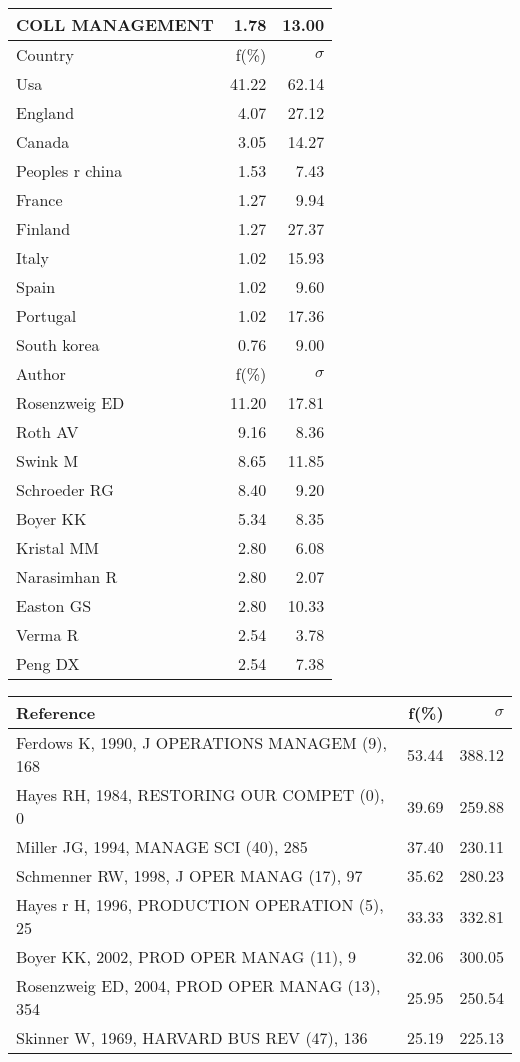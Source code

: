 \documentclass[a4paper,11pt]{report}
\begin{document}
\begin{landscape}
\begin{table}[!ht]
{\begin{tabular}{|l r r|}
COLL MANAGEMENT & 1.78 & 13.00\\
\hline
\hline
Country & f(\%) & $\sigma$\\
\hline
Usa & 41.22 & 62.14\\
England & 4.07 & 27.12\\
Canada & 3.05 & 14.27\\
Peoples r china & 1.53 & 7.43\\
France & 1.27 & 9.94\\
Finland & 1.27 & 27.37\\
Italy & 1.02 & 15.93\\
Spain & 1.02 & 9.60\\
Portugal & 1.02 & 17.36\\
South korea & 0.76 & 9.00\\
\hline
\hline
Author & f(\%) & $\sigma$\\
\hline
Rosenzweig ED & 11.20 & 17.81\\
Roth AV & 9.16 & 8.36\\
Swink M & 8.65 & 11.85\\
Schroeder RG & 8.40 & 9.20\\
Boyer KK & 5.34 & 8.35\\
Kristal MM & 2.80 & 6.08\\
Narasimhan R & 2.80 & 2.07\\
Easton GS & 2.80 & 10.33\\
Verma R & 2.54 & 3.78\\
Peng DX & 2.54 & 7.38\\
\hline
\end{tabular}
}
{\scriptsize\begin{tabular}{|l r r|}
\hline
Reference & f(\%) & $\sigma$\\
\hline
Ferdows K, 1990, J OPERATIONS MANAGEM (9), 168 & 53.44 & 388.12\\
Hayes RH, 1984, RESTORING OUR COMPET (0), 0 & 39.69 & 259.88\\
Miller JG, 1994, MANAGE SCI (40), 285 & 37.40 & 230.11\\
Schmenner RW, 1998, J OPER MANAG (17), 97 & 35.62 & 280.23\\
Hayes r H, 1996, PRODUCTION OPERATION (5), 25 & 33.33 & 332.81\\
Boyer KK, 2002, PROD OPER MANAG (11), 9 & 32.06 & 300.05\\
Rosenzweig ED, 2004, PROD OPER MANAG (13), 354 & 25.95 & 250.54\\
Skinner W, 1969, HARVARD BUS REV (47), 136 & 25.19 & 225.13\\

\end{tabular}}
\end{table}
\end{landscape}
\end{document}
